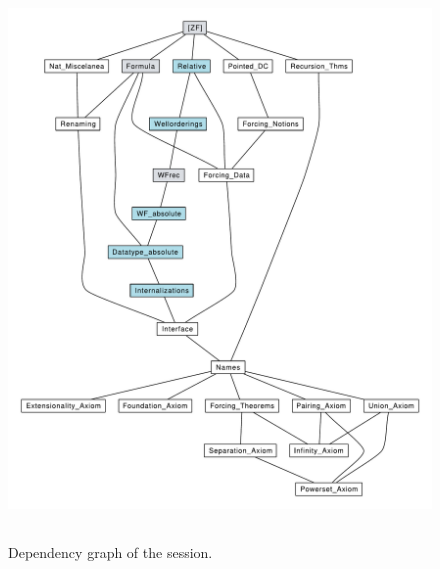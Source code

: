 \begin{figure}[!b]
  \begin{center}
    \includegraphics[height=14.8cm]{session_graph_colored.pdf}
  \end{center}
  \caption{Dependency graph of the  session.}
  \label{fig:deps}
\end{figure}

